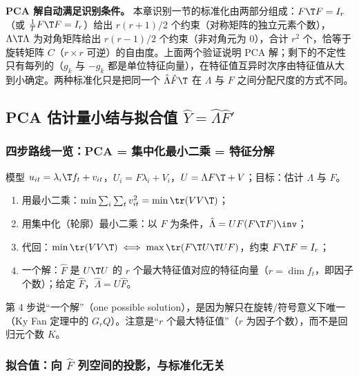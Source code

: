 \textbf{PCA 解自动满足识别条件。} 本章识别一节的标准化由两部分组成：$F\T F=I_r$（或 $\frac1TF\T F=I_r$）给出 $r(r+1)/2$ 个约束（对称矩阵的独立元素个数），$\Lambda\T\Lambda$ 为对角矩阵给出 $r(r-1)/2$ 个约束（非对角元为 0），合计 $r^2$ 个，恰等于旋转矩阵 $C$（$r\times r$ 可逆）的自由度。上面两个验证说明 PCA 解；剩下的不定性只有每列的（$g_k$ 与 $-g_k$ 都是单位特征向量），在特征值互异时次序由特征值从大到小确定。两种标准化只是把同一个 $\hat\Lambda\hat F\T$ 在 $\Lambda$ 与 $F$ 之间分配尺度的方式不同。

\subsection{PCA 估计量小结与拟合值 \texorpdfstring{$\hat Y=\hat\Lambda\hat F'$}{Y-hat = Lambda-hat F-hat'}}

\subsubsection{四步路线一览：PCA = 集中化最小二乘 = 特征分解}

\begin{method}[PCA 估计的四步（标准化 $F\T F=I_r$）]
模型 $u_{it}=\lambda_i\T f_t+v_{it}$，$U_i=F\lambda_i+V_i$，$U=\Lambda F\T+V$；目标：估计 $\Lambda$ 与 $F$。
\begin{enumerate}
\item 用最小二乘：$\min\sum_i\sum_tv_{it}^2=\min\tr(VV\T)$；
\item 用集中化（轮廓）最小二乘：以 $F$ 为条件，$\hat\Lambda=UF(F\T F)\inv$；
\item 代回：$\min\tr(VV\T)\iff\max\tr(F\T U\T UF)$，约束 $F\T F=I_r$；
\item 一个解：$\hat F$ 是 $U\T U$ 的 $r$ 个最大特征值对应的特征向量（$r=\dim f_t$，即因子个数）；给定 $\hat F$，$\hat\Lambda=U\hat F$。
\end{enumerate}
\end{method}

第 4 步说“一个解”（one possible solution），是因为解只在旋转/符号意义下唯一（Ky Fan 定理中的 $G_rQ$）。注意是“$r$ 个最大特征值”（$r$ 为因子个数），而不是回归元个数 $K$。

\subsubsection{拟合值：向 \texorpdfstring{$\hat F$}{F-hat} 列空间的投影，与标准化无关}

